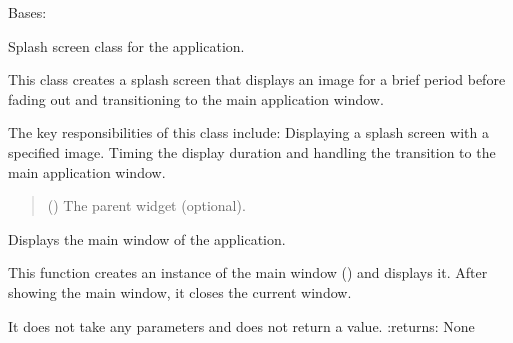 \documentclass[letterpaper,10pt,english]{sphinxmanual}
\begin{document}

\begin{fulllineitems}
\label{\detokenize{main:main.SplashScreen}}
\pysigstartsignatures
{}
\pysigstopsignatures
\sphinxAtStartPar
Bases: 

\sphinxAtStartPar
Splash screen class for the application.

\sphinxAtStartPar
This class creates a splash screen that displays an image for a brief period before fading out and transitioning to the main application window.

\sphinxAtStartPar
The key responsibilities of this class include:
\sphinxhyphen{} Displaying a splash screen with a specified image.
\sphinxhyphen{} Timing the display duration and handling the transition to the main application window.
\begin{quote}\begin{description}
\sphinxAtStartPar
{} (\sphinxstyleliteralemphasis{\sphinxupquote{, }}) \textendash{} The parent widget (optional).

\end{description}\end{quote}

\begin{fulllineitems}
\label{\detokenize{main:main.SplashScreen.show_main_window}}
\pysigstartsignatures
{}
\pysigstopsignatures
\sphinxAtStartPar
Displays the main window of the application.

\sphinxAtStartPar
This function creates an instance of the main window () and displays it.
After showing the main window, it closes the current window.

\sphinxAtStartPar
It does not take any parameters and does not return a value.
:returns: None

\end{fulllineitems}


\begin{fulllineitems}
\label{\detokenize{main:main.SplashScreen.staticMetaObject}}
\pysigstartsignatures
{}
\pysigstopsignatures
\end{fulllineitems}


\end{fulllineitems}
\end{document}
